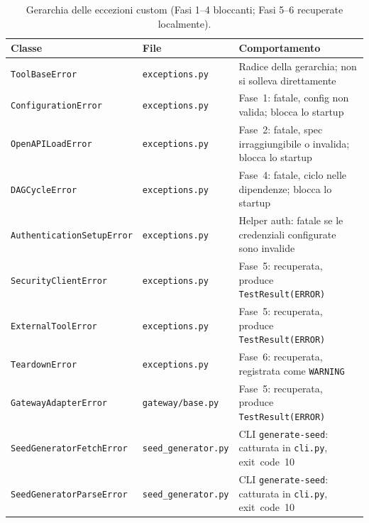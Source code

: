 \begin{table}[ht]
  \centering
  \small
  \begin{tabularx}{\textwidth}{@{}llX@{}}
    \toprule
    \textbf{Classe}                   & \textbf{File}               & \textbf{Comportamento}                                                       \\
    \midrule
    \texttt{ToolBaseError}            & \texttt{exceptions.py}      & Radice della gerarchia; non si solleva direttamente                          \\
    \addlinespace
    \texttt{ConfigurationError}       & \texttt{exceptions.py}      & Fase~1: fatale, config non valida; blocca lo startup                         \\
    \addlinespace
    \texttt{OpenAPILoadError}         & \texttt{exceptions.py}      & Fase~2: fatale, spec irraggiungibile o invalida; blocca lo startup           \\
    \addlinespace
    \texttt{DAGCycleError}            & \texttt{exceptions.py}      & Fase~4: fatale, ciclo nelle dipendenze; blocca lo startup                    \\
    \addlinespace
    \texttt{AuthenticationSetupError} & \texttt{exceptions.py}      & Helper auth: fatale se le credenziali configurate sono invalide              \\
    \addlinespace
    \texttt{SecurityClientError}      & \texttt{exceptions.py}      & Fase~5: recuperata, produce \texttt{TestResult(ERROR)}                       \\
    \addlinespace
    \texttt{ExternalToolError}        & \texttt{exceptions.py}      & Fase~5: recuperata, produce \texttt{TestResult(ERROR)}                       \\
    \addlinespace
    \texttt{TeardownError}            & \texttt{exceptions.py}      & Fase~6: recuperata, registrata come \texttt{WARNING}                         \\
    \addlinespace
    \texttt{GatewayAdapterError}      & \texttt{gateway/base.py}    & Fase~5: recuperata, produce \texttt{TestResult(ERROR)}                       \\
    \addlinespace
    \texttt{SeedGeneratorFetchError}  & \texttt{seed\_generator.py} & \gls{CLI} \texttt{generate-seed}: catturata in \texttt{cli.py}, exit~code~10 \\
    \addlinespace
    \texttt{SeedGeneratorParseError}  & \texttt{seed\_generator.py} & \gls{CLI} \texttt{generate-seed}: catturata in \texttt{cli.py}, exit~code~10 \\
    \bottomrule
  \end{tabularx}
  \caption{Gerarchia delle eccezioni custom (Fasi 1--4 bloccanti; Fasi 5--6 recuperate localmente).}
  \label{tab:exception-hierarchy}
\end{table}
